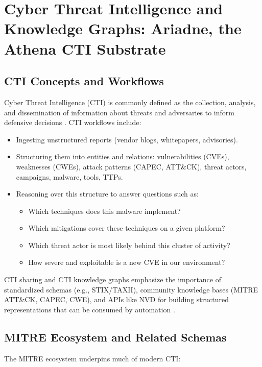 \documentclass[unnumsec,webpdf,contemporary,large]{oup-authoring-template}
\theoremstyle{thmstyleone}
\theoremstyle{thmstyletwo}
\theoremstyle{thmstylethree}
\begin{document}
\section{Cyber Threat Intelligence and Knowledge Graphs: Ariadne, the Athena CTI Substrate}
\label{sec:cti-kg}

\subsection{CTI Concepts and Workflows}

Cyber Threat Intelligence (CTI) is commonly defined as the collection, analysis, and dissemination of information about threats and adversaries to inform defensive decisions \cite{mcmillan2013gartner}. CTI workflows include:

\begin{itemize}
  \item Ingesting unstructured reports (vendor blogs, whitepapers, advisories).
  \item Structuring them into entities and relations: vulnerabilities (CVEs), weaknesses (CWEs), attack patterns (CAPEC, ATT\&CK), threat actors, campaigns, malware, tools, TTPs.
  \item Reasoning over this structure to answer questions such as:
    \begin{itemize}
      \item Which techniques does this malware implement?
      \item Which mitigations cover these techniques on a given platform?
      \item Which threat actor is most likely behind this cluster of activity?
      \item How severe and exploitable is a new CVE in our environment?
    \end{itemize}
\end{itemize}

CTI sharing and CTI knowledge graphs emphasize the importance of standardized schemas (e.g., STIX/TAXII), community knowledge bases (MITRE ATT\&CK, CAPEC, CWE), and APIs like NVD for building structured representations that can be consumed by automation \cite{strom2018mitreattck,mitreCVE,mitreCWE,mitreCAPEC}.

\subsection{MITRE Ecosystem and Related Schemas}

The MITRE ecosystem underpins much of modern CTI:
\end{document}
